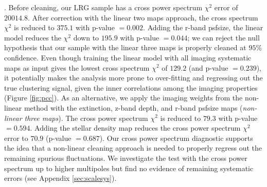. Before cleaning, our LRG sample has a cross power spectrum $\chi^{2}$ error of $20014.8$. After correction with the linear two maps approach, the cross spectrum $\chi^{2}$ is reduced to $375.1$ with p-value $=0.002$. Adding the r-band psfsize, the linear model reduces the $\chi^{2}$ down to $195.9$ with p-value $=0.044$; we can reject the null hypothesis that our sample with the linear three maps is properly cleaned at $95\%$ confidence. Even though training the linear model with all imaging systematic maps as input gives the lowest cross spectrum $\chi^{2}$ of $129.2$ (and p-value $=0.239$), it potentially makes the analysis more prone to over-fitting and regressing out the true clustering signal, given the inner correlations among the imaging properties (Figure \ref{fig:pcc}). As an alternative, we apply the imaging weights from the non-linear method with the extinction, z-band depth, and r-band psfsize maps (\textit{non-linear three maps}). The cross power spectrum $\chi^{2}$ is reduced to $79.3$ with p-value $=0.594$.  Adding the stellar density map reduces the cross power spectrum $\chi^{2}$ error to $70.9$ (p-value $=0.687$). Our cross power spectrum diagnostic supports the idea that a non-linear cleaning approach is needed to properly regress out the remaining spurious fluctuations. We investigate the test with the cross power spectrum up to higher multipoles but find no evidence of remaining systematic errors (see Appendix \ref{sec:scalesys}). 

